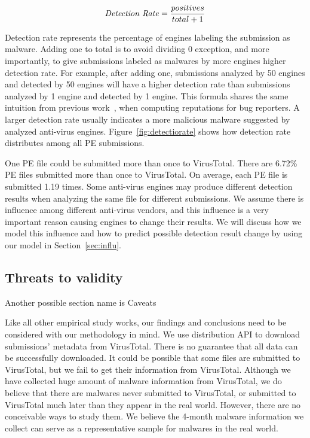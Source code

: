 $$ \textrm{\textit{Detection Rate}} = \dfrac{positives}{total + 1}$$

Detection rate represents the percentage of engines labeling the submission as malware. 
Adding one to total is to avoid dividing 0 exception, and more importantly, 
to give submissions labeled as malwares by more engines higher detection rate. 
For example, after adding one, submissions analyzed by 50 engines and detected by 50 engines will have a higher detection rate 
than submissions analyzed by 1 engine and detected by 1 engine. 
This formula shares the same intuition from previous work~\cite{GuoICSE2010}, when computing reputations for bug reporters. 
A larger detection rate usually indicates a more malicious malware suggested by analyzed anti-virus engines. 
Figure~\ref{fig:detectiorate} shows how detection rate distributes among all PE submissions. 

One PE file could be submitted more than once to VirusTotal. 
There are 6.72\% PE files submitted more than once to VirusTotal. 
On average, each PE file is submitted 1.19 times. 
Some anti-virus engines may produce different detection results when analyzing the same file for different submissions.
We assume there is influence among different anti-virus vendors, 
and this influence is a very important reason causing engines to change their results.
We will discuss how we model this influence and how to predict possible detection result change by using our model in Section~\ref{sec:influ}.

\subsection{Threats to validity}

{\color{red} Another possible section name is Caveats}

Like all other empirical study works, 
our findings and conclusions need to be considered with our methodology in mind. 
We use distribution API to download submissions' metadata from VirusTotal. 
There is no guarantee that all data can be successfully downloaded. 
It could be possible that some files are submitted to VirusTotal, 
but we fail to get their information from VirusTotal.
Although we have collected huge amount of malware information from VirusTotal,
we do believe that there are malwares never submitted to VirusTotal, 
or submitted to VirusTotal much later than they appear in the real world. 
However, there are no conceivable ways to study them.
We believe the 4-month malware information we collect can serve as a representative sample for malwares in the real world. 
